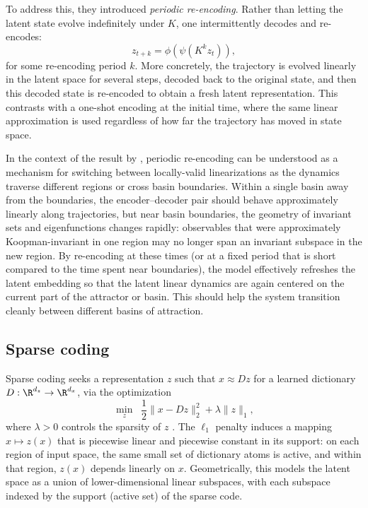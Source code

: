 To address this, they introduced \emph{periodic re-encoding}.
Rather than letting the latent state evolve indefinitely under $K$, one intermittently decodes and re-encodes:
\begin{equation}
z_{t+k} = \phi\!\left(\psi\!\left(K^k z_t\right)\right),
\end{equation}
for some re-encoding period $k$.
More concretely, the trajectory is evolved linearly in the latent space for several steps, decoded back to the original state, and then this decoded state is re-encoded to obtain a fresh latent representation.
This contrasts with a one-shot encoding at the initial time, where the same linear approximation is used regardless of how far the trajectory has moved in state space.

In the context of the result by \citet{lan_linearization_2013}, periodic re-encoding can be understood as a mechanism for switching between locally-valid linearizations as the dynamics traverse different regions or cross basin boundaries.
Within a single basin away from the boundaries, the encoder–decoder pair should behave approximately linearly along trajectories, but near basin boundaries, the geometry of invariant sets and eigenfunctions changes rapidly: observables that were approximately Koopman-invariant in one region may no longer span an invariant subspace in the new region.
By re-encoding at these times (or at a fixed period that is short compared to the time spent near boundaries), the model effectively refreshes the latent embedding so that the latent linear dynamics are again centered on the current part of the attractor or basin. This should help the system transition cleanly between different basins of attraction.

\subsection{Sparse coding}
\label{sec:background-sparse}

Sparse coding seeks a representation $z$ such that $x \approx Dz$ for a learned dictionary $D : \R^{d_z} \to \R^{d_x}$, via the optimization
\begin{equation}
\min_z \;\; \frac{1}{2} \|x - D z\|_2^2 + \lambda \|z\|_1,
\end{equation}
where $\lambda > 0$ controls the sparsity of $z$ \citep{olshausen_emergence_1996, chen_atomic_1998, donoho_optimally_2003}.
The $\ell_1$ penalty induces a mapping $x \mapsto z(x)$ that is piecewise linear and piecewise constant in its support: on each region of input space, the same small set of dictionary atoms is active, and within that region, $z(x)$ depends linearly on $x$.
Geometrically, this models the latent space as a union of lower-dimensional linear subspaces, with each subspace indexed by the support (active set) of the sparse code.

